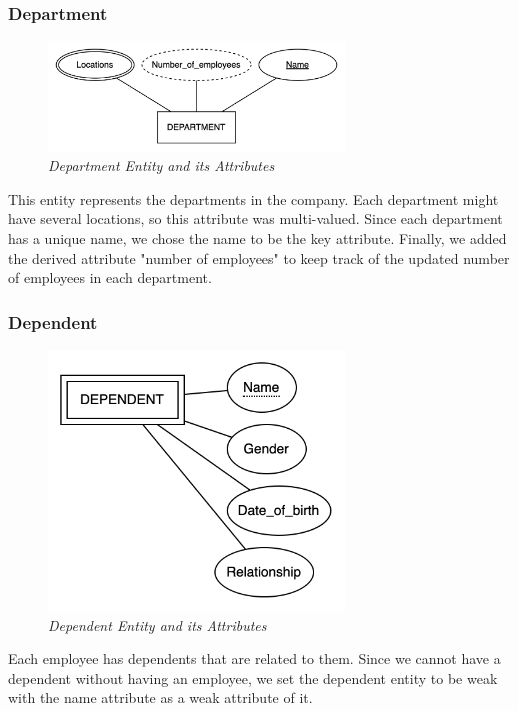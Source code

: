 \documentclass[11pt]{article}
\begin{document}
\subsubsection{Department}
\begin{figure}[H]
  \centering
  \includegraphics[width=0.7\textwidth]{images/entities/department.png}
  \caption{\textit{Department Entity and its Attributes}}
\end{figure}

This entity represents the departments in the company. Each department might have several locations, so this attribute was multi-valued. Since each department has a unique name, we chose the name to be the key attribute. Finally, we added the derived attribute "number of employees" to keep track of the updated number of employees in each department.

\subsubsection{Dependent}
\begin{figure}[H]
  \centering
  \includegraphics[width=0.7\textwidth]{images/entities/dependent.png}
  \caption{\textit{Dependent Entity and its Attributes}}
\end{figure}

Each employee has dependents that are related to them. Since we cannot have a dependent without having an employee, we set the dependent entity to be weak with the name attribute as a weak attribute of it.
\end{document}
